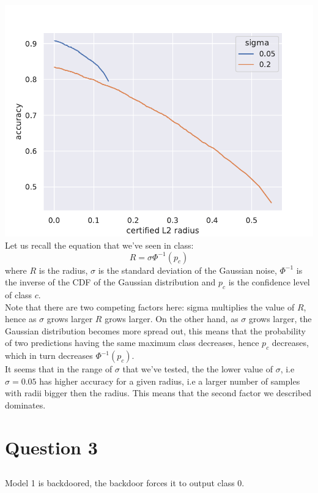 \documentclass{article}
\begin{document}
\subsection{}
\includegraphics[scale=0.7]{randomized-smoothing-acc-vs-radius.pdf} \\
Let us recall the equation that we've seen in class:
$$R=\sigma \Phi^{-1}(p_c)$$
where $R$ is the radius, $\sigma$ is the standard deviation of the Gaussian noise, 
$\Phi^{-1}$ is the inverse of the CDF of the Gaussian distribution and 
$p_c$ is the confidence level of class $c$. \\
Note that there are two competing factors here: sigma multiplies the value of $R$, hence as $\sigma$ grows larger $R$ grows larger.
On the other hand, as $\sigma$ grows larger, the Gaussian distribution becomes more spread out, this means that the probability of two 
predictions having the same maximum class decreases, hence $p_c$ decreases, which in turn decreases $\Phi^{-1}(p_c)$. \\
It seems that in the range of $\sigma$ that we've tested, the the lower value of $\sigma$, i.e $\sigma=0.05$ has higher accuracy
for a given radius, i.e a larger number of samples with radii bigger then the radius. This means that the second factor we described dominates.
\section{Question 3}
\setcounter{subsection}{1}
\subsection{}
Model 1 is backdoored, the backdoor forces it to output class 0.
\end{document}
